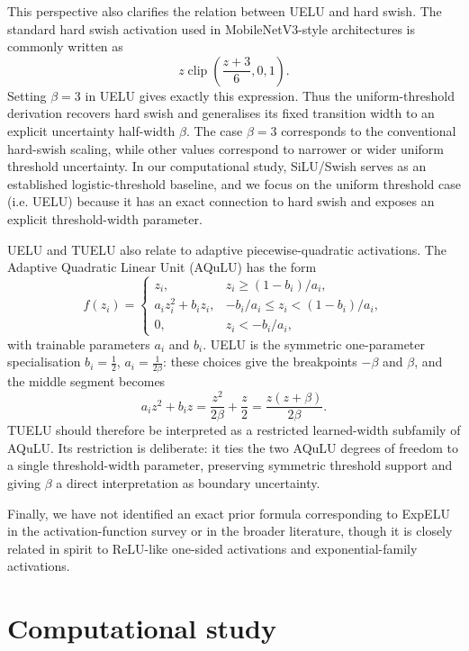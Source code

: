 \documentclass[11pt]{article}
\begin{document}
This perspective also clarifies the relation between UELU and hard swish. The standard hard swish activation used in MobileNetV3-style architectures \cite{howard2019mobilenetv3} is commonly written as 
$$
z\operatorname{clip}\left(\frac{z+3}{6},0,1\right).
$$
Setting $\beta=3$ in UELU gives exactly this expression.
Thus the uniform-threshold derivation recovers hard swish and generalises its fixed transition width to an explicit uncertainty half-width $\beta$. The case $\beta=3$ corresponds to the conventional hard-swish scaling, while other values correspond to narrower or wider uniform threshold uncertainty.
In our computational study, SiLU/Swish serves as an established logistic-threshold baseline, and we focus on the uniform threshold case (i.e. UELU) because it has an exact connection to hard swish and exposes an explicit threshold-width parameter.

UELU and TUELU also relate to adaptive piecewise-quadratic activations. The Adaptive Quadratic Linear Unit (AQuLU) \cite{wu2023aqulu} has the form
$$
f(z_i)=
\begin{cases}
z_i, & z_i \ge (1-b_i)/a_i,\\
a_i z_i^2+b_i z_i, & -b_i/a_i\le z_i<(1-b_i)/a_i,\\
0, & z_i<-b_i/a_i,
\end{cases}
$$
with trainable parameters $a_i$ and $b_i$. 
UELU is the symmetric one-parameter specialisation $b_i=\tfrac{1}{2}$, $a_i=\tfrac{1}{2\beta}$: these choices give the breakpoints $-\beta$ and $\beta$, and the middle segment becomes
$$
a_i z^2+b_i z
=
\frac{z^2}{2\beta}+\frac{z}{2}
=
\frac{z(z+\beta)}{2\beta}.
$$
TUELU should therefore be interpreted as a restricted learned-width subfamily of AQuLU. Its restriction is deliberate: it ties the two AQuLU degrees of freedom to a single threshold-width parameter, preserving symmetric threshold support and giving $\beta$ a direct interpretation as boundary uncertainty.

Finally, we have not identified an exact prior formula corresponding to ExpELU in the activation-function survey \cite{kunc2024decadesactivationscomprehensivesurvey} or in the broader literature, though it is closely related in spirit to ReLU-like one-sided activations and exponential-family activations.

\section{Computational study}
\label{sec:computational-study}
\end{document}
